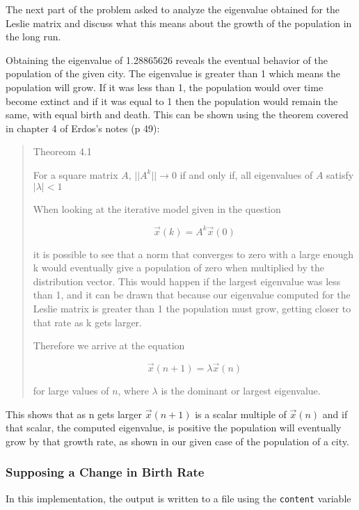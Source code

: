 \documentclass[letterpaper,12pt]{article}
\begin{document}
The next part of the problem asked to analyze the eigenvalue obtained for the
Leslie matrix and discuss what this means about the growth of the population in
the long run.

Obtaining the eigenvalue of 1.28865626 reveals the eventual behavior of the
population of the given city.
The eigenvalue is greater than 1 which means the population will grow.
If it was less than 1, the population would over time become extinct and if
it was equal to 1 then the population would remain the same, with equal birth and death.
This can be shown using the theorem covered in chapter 4 of Erdos's notes (p 49):

\begin{quote}
Theoreom 4.1

For a square matrix $A$,
$||A^k|| \to 0$ if and only if, all eigenvalues of $A$ satisfy $|\lambda| < 1$

When looking at the iterative model given in the question 

\[\vec{x}(k) = A^k \vec{x}(0)\]

it is possible to see that a norm that converges to zero with a large enough k would eventually give a population of zero when multiplied by the distribution vector.
This would happen if the largest eigenvalue was less than 1, and it can be drawn that because our eigenvalue computed for
the Leslie matrix is greater than 1 the population must grow, getting closer to that rate as k gets larger.

Therefore we arrive at the equation

\[\vec{x}(n+1) = \lambda\vec{x}(n)\]

for large values of $n$, where $\lambda$ is the dominant or largest eigenvalue.
\end{quote}

This shows that as n gets larger $\vec{x}(n+1)$ is a scalar multiple of $\vec{x}(n)$ and if that scalar,
the computed eigenvalue, is positive the population will eventually grow by that growth rate,
as shown in our given case of the population of a city.

\subsubsection{Supposing a Change in Birth Rate}

In this implementation, the output is written to a file using the \texttt{content} variable
\end{document}
